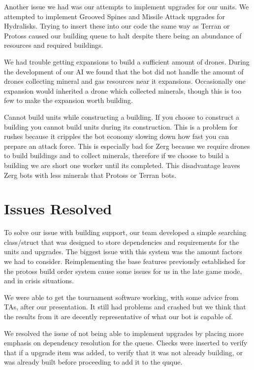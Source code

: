 \documentclass{article}
\begin{document}
Another issue we had was our attempts to implement upgrades for our units. We attempted to implement Grooved Spines and Missile Attack upgrades for Hydralisks. Trying to insert these into our code the same way as Terran or Protoss caused our building queue to halt despite there being an abundance of resources and required buildings.

We had trouble getting expansions to build a sufficient amount of drones. During the development of our AI we found that the bot did not handle the amount of drones collecting mineral and gas resources near it expansions. Occasionally one expansion would inherited a drone which collected minerals, though this is too few to make the expansion worth building. 

Cannot build units while constructing a building. If you choose to construct a building you cannot build units during its construction. This is a problem for rushes because it cripples the bot economy slowing down how fast you can prepare an attack force. This is especially bad for Zerg because we require drones to build buildings and to collect minerals, therefore if we choose to build a building we are short one worker until its completed. This disadvantage leaves Zerg bots with less minerals that Protoss or Terran bots.

\section{Issues Resolved}

To solve our issue with building support, our team developed a simple searching class/struct that was designed to store dependencies and requirements for the units and upgrades. The biggest issue with this system was the amount factors we had to consider. Reimplementing the base features previously established for the protoss build order system cause some issues for us in the late game mode, and in crisis situations.

We were able to get the tournament software working, with some advice from TAs, after our presentation. It still had problems and crashed but we think that the results from it are decently representative of what our bot is capable of.

We resolved the issue of not being able to implement upgrades by placing more emphasis on dependency resolution for the queue. Checks were inserted to verify that if a upgrade item was added, to verify that it was not already building, or was already built before proceeding to add it to the quque.
\end{document}
